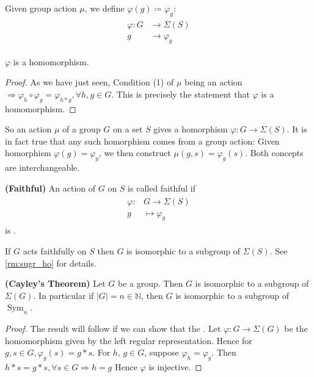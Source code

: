 \documentclass{article}
\newcommand{\bfs}[1]{\textbf{({#1}) }}
\newcommand{\Sym}{\operatorname{Sym}}
\begin{document}
Given group action $\mu$, we define $\varphi(g)\coloneqq \varphi_{g}$:
\begin{align*}
\begin{aligned}
\varphi: G & \rightarrow \Sigma(S) \\
g & \rightarrow \varphi_{g}
\end{aligned}
\end{align*}
\begin{lema}
 $\varphi$ is a homomorphism.
\end{lema}
\begin{proof}
As we have just seen, Condition (1) of $\mu$ being an action $\Rightarrow \varphi_{h} \circ \varphi_{g}=\varphi_{h * g}, \forall h, g \in G$. This is precisely the statement that $\varphi$ is a homomorphism. 
\end{proof}

\begin{rema}
So an action $\mu$ of a group $G$ on a set $S$ gives a homorphism $\varphi: G \longrightarrow \Sigma(S) .$  It is in fact true that any such homorphism comes from a  group action:
Given homorphism $\varphi(g)= \varphi_{g}$, we then construct $\mu(g,s) = \varphi_{g}(s)$. 
Both concepts are interchangeable.
\end{rema}
\centerline{}
\begin{defa}{\bfs{Faithful}}
  An action of $G$ on $S$ is called faithful if
\begin{align*}
\begin{aligned}
\varphi: & G \rightarrow \Sigma(S) \\
g & \mapsto \varphi_{g}
\end{aligned}
\end{align*}
is .
\end{defa} 
\begin{rema}
If $G$ acts faithfully on $S$ then $G$ is isomorphic to a subgroup of $\Sigma(S)$. See \cref{rm:sugr_ho} for details.
\end{rema}

\begin{thma}{\bfs{Cayley's Theorem}}\label{thm:cayley}
Let $G$ be a group. Then $G$ is isomorphic to a subgroup of $\Sigma(G) .$ In particular if $|G|=n \in \mathbb{N}$, then $G$ is isomorphic to a subgroup of $\Sym_{n}$.
\end{thma}
\begin{proof}
The result will follow if we can show that the . Let $\varphi: G \rightarrow \Sigma(G)$ be the homomorphism given by the left regular representation. Hence for $g, s \in G, \varphi_{g}(s)=g * s$. For $h$, $g \in G$, suppose $\varphi_{h}=\varphi_{g} .$ Then $h * s=g * s, \forall s \in G \Rightarrow h=g$
Hence $\varphi$ is injective.
\end{proof} 
\end{document}
